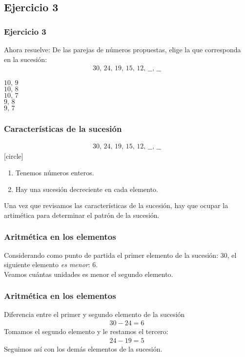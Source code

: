 \subsection{Ejercicio 3}

\begin{frame}
\frametitle{Ejercicio 3}
Ahora resuelve: De las parejas de números propuestas, elige la que corresponda en la sucesión:
\begin{align*}
30, \, 24, \, 19, \, 15, \, 12, \, \_\_ , \, \_\_
\end{align*}
\begin{choices}
\choice $10, \, 9$ \\
\choice $10, \, 8$ \\
\choice $10, \, 7$ \\
\choice $9, \, 8$ \\
\choice $9, \, 7$ \\
\end{choices} 
\end{frame}
\begin{frame}
\frametitle{Características de la sucesión}
\begin{align*}
30, \, 24, \, 19, \, 15, \, 12, \, \_\_ , \, \_\_
\end{align*}
[circle]
\begin{enumerate}[<+->]
\item Tenemos números enteros.
\item Hay una sucesión decreciente en cada elemento.
\end{enumerate}
\pause
Una vez que revisamos las características de la sucesión, hay que ocupar la artimética para determinar el patrón de la sucesión.
\end{frame}
\begin{frame}
\frametitle{Aritmética en los elementos}
Considerando como punto de partida el primer elemento de la sucesión: $30$, el siguiente elemento \emph{es menor}: $6$.
\\
\bigskip
\pause
Veamos cuántas unidades es menor el segundo elemento.
\end{frame}
\begin{frame}
\frametitle{Aritmética en los elementos}
Diferencia entre el primer y segundo elemento de la sucesión
\begin{align*}
30 - 24 = 6
\end{align*}
\pause
Tomamos el segundo elemento y le restamos el tercero:
\begin{align*}
24 - 19 = 5
\end{align*}
\pause
Seguimos así con los demás elementos de la sucesión.  
\end{frame}
